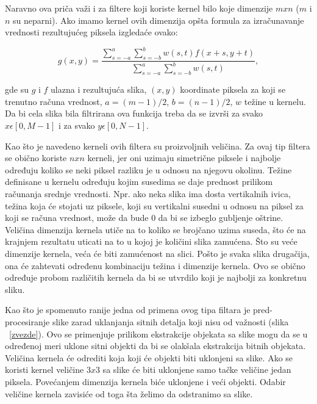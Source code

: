 \documentclass[a4paper,12pt,titlepage]{article}
\begin{document}
Naravno ova priča važi i za filtere koji koriste kernel bilo koje dimenzije $m x n$ ($m$ i $n$ su neparni). Ako imamo kernel ovih dimenzija opšta formula za izračunavanje vrednosti rezultujućeg piksela izgledaće ovako: 

\begin{equation}\label{eq:smoot1}
g(x, y) = \dfrac{\sum_{s = -a}^{a} \sum_{s = -b}^{b} w(s, t)f(x + s, y + t)}{\sum_{s = -a}^{a} \sum_{s = -b}^{b} w(s, t)}, 
\end{equation}

gde su $g$ i $f$ ulazna i rezultujuća slika, $(x, y)$ koordinate piksela za koji se trenutno računa vrednost, $a = (m - 1) / 2$, $b = (n - 1) / 2$, $w$ težine u kernelu. Da bi cela slika bila filtrirana ova funkcija treba da se izvrši za svako $x \epsilon [0, M - 1]$ i za svako $y \epsilon [0, N - 1]$. 

Kao što je navedeno kerneli ovih filtera su proizvoljnih veličina. Za ovaj tip filtera se obično koriste $n x n$ kerneli, jer oni uzimaju simetrične piksele i najbolje određuju koliko se neki piksel razliku je u odnosu na njegovu okolinu. Težine definisane u kernelu određuju kojim susedima se daje prednost prilikom računanja srednje vrednosti. Npr. ako neka slika ima dosta vertikalnih ivica, težina koja će stojati uz piksele, koji su vertikalni susedni u odnosu na piksel za koji se računa vrednost, može da bude 0 da bi se izbeglo gubljenje oštrine. Veličina dimenzija kernela utiče na to koliko se brojčano uzima suseda, što će na krajnjem rezultatu uticati na to u kojoj je količini slika zamućena. Što su veće dimenzije kernela, veća će biti zamućenost na slici. Pošto je svaka slika drugačija, ona će zahtevati određenu kombinaciju težina i dimenzije kernela. Ovo se obično određuje probom različitih kernela da bi se utvrdilo koji je najbolji za konkretnu sliku. 

Kao što je spomenuto ranije jedna od primena ovog tipa filtara je pred-procesiranje slike zarad uklanjanja sitnih detalja koji nisu od važnosti (slika ~\ref{zvezde}). Ovo se primenjuje prilikom ekstrakcije objekata sa slike mogu da se u određenoj meri uklone sitni objekti da bi se olakšala ekstrakcija bitnih objekata. Veličina kernela će odrediti koja koji će objekti biti uklonjeni sa slike. Ako se koristi kernel veličine $3 x 3$ sa slike će biti uklonjene samo tačke veličine jedan piksela. Povećanjem dimenzija kernela biće uklonjene i veći objekti. Odabir veličine kernela zavisiće od toga šta želimo da odstranimo sa slike.
\end{document}
